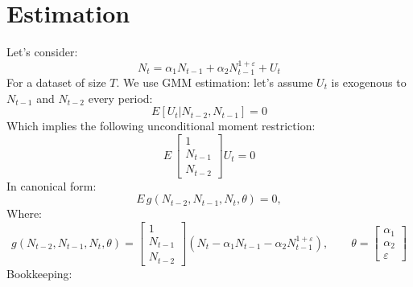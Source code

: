 \documentclass[11pt]{article}
\begin{document}
\section{Estimation}
    Let's consider:
    \begin{equation}
        N_{t} = \alpha_1 N_{t-1} + \alpha_2 N_{t-1}^{1 + \varepsilon} + U_t
    \end{equation}
    For a dataset of size $T$. We use GMM estimation:
    let's assume $U_t$ is exogenous to $N_{t-1}$ and $N_{t-2}$ every period:
    \begin{equation}
        E[U_t|N_{t-2}, N_{t-1}] = 0
    \end{equation}
    Which implies the following unconditional moment restriction:
    \begin{equation}
        E \, \begin{bmatrix} 1  \\ N_{t-1} \\ N_{t-2} \end{bmatrix} U_t = 0
    \end{equation}
    In canonical form:
     \begin{equation}
        E \, g(N_{t-2}, N_{t-1}, N_t, \theta) = 0,
    \end{equation}
    Where:
    \begin{equation}
        g(N_{t-2}, N_{t-1}, N_t, \theta) =  \begin{bmatrix} 1 \\ N_{t-1} \\ N_{t-2}  \end{bmatrix} \left( N_{t} - \alpha_1 N_{t-1} - \alpha_2 N_{t-1}^{1 + \varepsilon} \right), \qquad \theta = \begin{bmatrix}
        \alpha_1 \\ \alpha_2 \\ \varepsilon \end{bmatrix}
    \end{equation}
    Bookkeeping:
\end{document}
